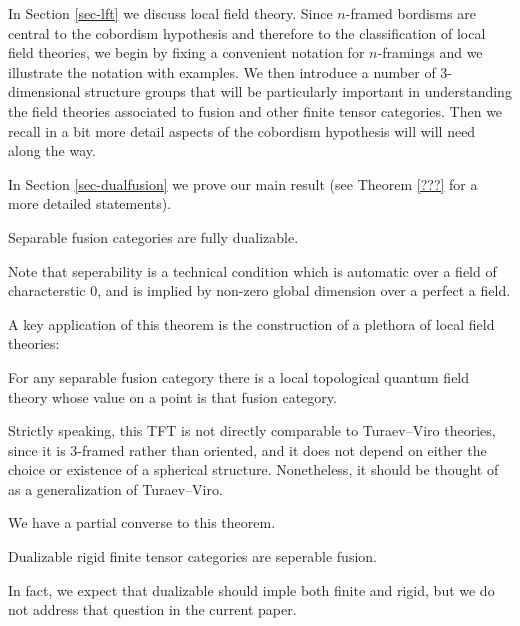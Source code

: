 \documentclass{amsart}
\begin{document}
In Section \ref{sec-lft} we discuss local field theory.  Since $n$-framed bordisms are central to the cobordism hypothesis and therefore to the classification of local field theories, we begin by fixing a convenient notation for $n$-framings and we illustrate the notation with examples.  We then introduce a number of $3$-dimensional structure groups that will be particularly important in understanding the field theories associated to fusion and other finite tensor categories.  Then we recall in a bit more detail aspects of the cobordism hypothesis will will need along the way.

In Section \ref{sec-dualfusion} we prove our main result (see Theorem \ref{???} for a more detailed statements).

\begin{theorem}
Separable fusion categories are fully dualizable.
\end{theorem}

\nid Note that seperability is a technical condition which is automatic over a field of characterstic $0$, and is implied by non-zero global dimension over a perfect a field.


A key application of this theorem is the construction of a plethora of local field theories:
\begin{corollary}
For any separable fusion category there is a local topological quantum field theory whose value on a point is that fusion category.
\end{corollary}

\nid Strictly speaking, this TFT is not directly comparable to Turaev--Viro theories, since it is $3$-framed rather than oriented, and it does not depend on either the choice or existence of a spherical structure.  Nonetheless, it should be thought of as a generalization of Turaev--Viro.

We have a partial converse to this theorem.

\begin{theorem}
Dualizable rigid finite tensor categories are seperable fusion.
\end{theorem}

In fact, we expect that dualizable should imple both finite and rigid, but we do not address that question in the current paper.
\end{document}
